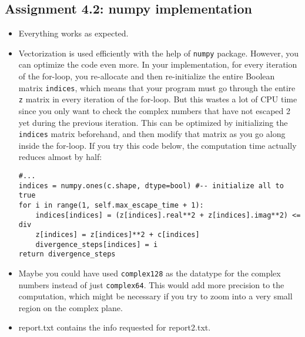 \documentclass[a4paper]{article}
\begin{document}
\subsection*{Assignment 4.2:  numpy implementation} \label{sec:assignment5.2}
\begin{itemize}
  \item Everything works as expected.
  
  \item Vectorization is used efficiently with the help of \texttt{numpy} package. However, you can optimize the code even more. In your implementation, for every iteration of the for-loop, you re-allocate and then re-initialize the entire Boolean matrix \texttt{indices}, which means that your program must go through the entire \texttt{z} matrix in every iteration of the for-loop. But this wastes a lot of CPU time since you only want to check the complex numbers that have not escaped 2 yet during the previous iteration. This can be optimized by initializing the \texttt{indices} matrix beforehand, and then modify that matrix as you go along inside the for-loop. If you try this code below, the computation time actually reduces almost by half: \newline
\begin{verbatim}
#...
indices = numpy.ones(c.shape, dtype=bool) #-- initialize all to true
for i in range(1, self.max_escape_time + 1):
    indices[indices] = (z[indices].real**2 + z[indices].imag**2) <= div
    z[indices] = z[indices]**2 + c[indices]
    divergence_steps[indices] = i
return divergence_steps
\end{verbatim}

  \item Maybe you could have used \texttt{complex128} as the datatype for the complex numbers instead of just \texttt{complex64}. This would add more precision to the computation, which might be necessary if you try to zoom into a very small region on the complex plane.
  \item report.txt contains the info requested for report2.txt.
\end{itemize}

\end{document}
